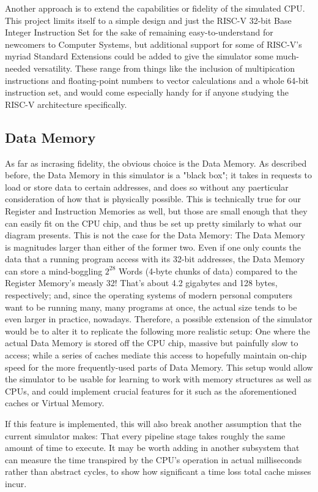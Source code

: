 \documentclass[12pt,twoside]{reedthesis}
\begin{document}
Another approach is to extend the capabilities or fidelity of the simulated CPU. This project limits itself to a simple design and just the RISC-V 32-bit Base Integer Instruction Set  for the sake of remaining easy-to-understand for newcomers to Computer Systems, but additional support for some of RISC-V's myriad Standard Extensions could be added to give the simulator some much-needed versatility. These range from things like the inclusion of multipication instructions and floating-point numbers to vector calculations and a whole 64-bit instruction set, and would come especially handy for if anyone studying the RISC-V architecture specifically.

\subsection{Data Memory}

As far as incrasing fidelity, the obvious choice is the Data Memory. As described before, the Data Memory in this simulator is a "black box"; it takes in requests to load or store data to certain addresses, and does so without any paerticular consideration of how that is physically possible. This is technically true for our Register and Instruction Memories as well, but those are small enough that they can easily fit on the CPU chip, and thus be set up pretty similarly to what our diagram presents. This is not the case for the Data Memory: The Data Memory is magnitudes larger than either of the former two. Even if one only counts the data that a running program access with its 32-bit addresses, the Data Memory can store a mind-boggling $2^28$ Words (4-byte chunks of data) compared to the Register Memory's measly 32! That's about 4.2 gigabytes and 128 bytes, respectively; and, since the operating systems of modern personal computers want to be running many, many programs at once, the actual size tends to be even larger in practice, nowadays. Therefore, a possible extension of the simulator would be to alter it to replicate the following more realistic setup: One where the actual Data Memory is stored off the CPU chip, massive but painfully slow to access; while a series of caches mediate this access to hopefully maintain on-chip speed for the more frequently-used parts of Data Memory. This setup would allow the simulator to be usable for learning to work with memory structures as well as CPUs, and could implement crucial features for it such as the aforementioned caches or Virtual Memory.

If this feature is implemented, this will also break another assumption that the current simulator makes: That every pipeline stage takes roughly the same amount of time to execute. It may be worth adding in another subsystem that can measure the time transpired by the CPU's operation in actual milliseconds rather than abstract cycles, to show how significant a time loss total cache misses incur.
\end{document}
